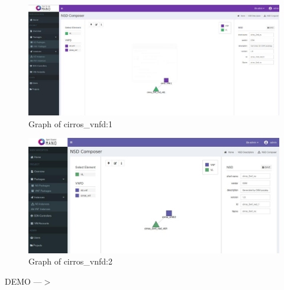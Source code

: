 \begin{frame}
\begin{figure}
	\centering
	\includegraphics[width=1\linewidth]{images/secondnsd2}
	\caption{Graph of cirros\_vnfd:1}
	\label{fig:secondnsd2}
\end{figure}
\end{frame}

\begin{frame}
\begin{figure}
	\centering
	\includegraphics[width=1\linewidth]{images/secondnsd}
	\caption{Graph of cirros\_vnfd:2}
	\label{fig:secondnsd}
\end{figure}
\end{frame}

\begin{frame}

\Huge{\centerline{DEMO ---$ > $}}

\end{frame}



